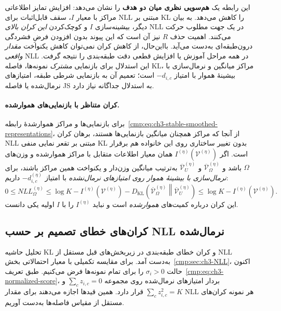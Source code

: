 این رابطه یک \textbf{هم‌سویی نظری میان دو هدف} را نشان می‌دهد:
افزایش تمایز اطلاعاتی مراکز با معیار $I$، سقف قابل‌اثبات
برای NLL مبتنی بر KL را کاهش می‌دهد. به بیان دیگر،
بیشینه‌سازی $I$ و کوچک‌کردن \emph{این کران بالای} NLL
در یک جهت مطلوب حرکت می‌کنند. اهمیت حذف $R$ نیز
آن است که این پیوند بدون افزودن فرضِ فشردگی درون‌طبقه‌ای
به‌دست می‌آید. بااین‌حال، از کاهش کران نمی‌توان
کاهش یکنواخت \emph{مقدار واقعی} NLL در همه مراحل آموزش
یا افزایش قطعی دقت طبقه‌بندی را نتیجه گرفت.
این استدلال برای بازنمایی \emph{مشترک} نمونه‌ها،
فاصله KL، مراکز میانگین و نرمال‌سازی با بیشینهٔ هموار با امتیاز
$-d_{i,c}$ است؛ تعمیم آن به بازنمایی شرطی طبقه،
امتیازهای نرمال‌شده یا فاصله JS به استدلال جداگانه نیاز دارد.

\paragraph{کران متناظر با بازنمایی‌های هموارشده.}
برای بازنمایی‌ها و مراکز هموارشدهٔ
رابطه~\eqref{cmp:eq:ch3-stable-smoothed-representations}،
از آنجا که مراکز همچنان میانگین بازنمایی‌ها هستند، برهان کران NLL
مبتنی بر تقعر نمایی منفی KL
بدون تغییر ساختاری روی این خانواده
هم برقرار است. اگر
$I^{(\eta)}(\mathcal V^{(\eta)})$
همان معیار اطلاعات متقابل با
مراکز هموارشده و وزن‌های $\Omega$ باشد و
$\overline{\mathcal V}^{(\eta)}_{\Omega}$
و $\overline{\mathcal V}^{(\eta)}_U$
به‌ترتیب میانگین وزن‌دار و یکنواخت
همین مراکز باشند، برای
\emph{نرمال‌سازی با بیشینهٔ هموار روی امتیازهای نرمال‌نشده}
با امتیاز $-d_{i,c}^{(\eta)}$ داریم:
\begin{equation}\label{cmp:eq:ch3-stable-NLL-I-bound}
\boxed{
0\le NLL_\Omega^{(\eta)}
\le \log K-I^{(\eta)}(\mathcal V^{(\eta)})
-D_{\mathrm{KL}}\!\left(
\overline{\mathcal V}^{(\eta)}_{\Omega}
\middle\|\overline{\mathcal V}^{(\eta)}_U
\right)
\le\log K-I^{(\eta)}(\mathcal V^{(\eta)}).
}
\end{equation}
این کران درباره کمیت‌های \emph{هموارشده}
است و نباید $I^{(\eta)}$ را با $I$
اولیه یکی دانست.

\subsection{کران‌های خطای تصمیم بر حسب NLL نرمال‌شده}
\label{cmp:subsec:ch3-margin-normalized-bound}
تحلیل حاشیه KL و کران خطای طبقه‌بندی در زیربخش‌های قبل مستقل از NLL به‌دست آمد. برای مقایسه تکمیلی با معیار احتمالاتی بخش~\ref{cmp:sec:ch3-NLL}، اکنون حالت $\sigma_i>0$ را برای تمام نمونه‌ها فرض می‌کنیم. طبق تعریف~\eqref{cmp:eq:ch3-normalized-score}، بردار امتیازهای نرمال‌شده روی مجموعه $\sum_cz_{i,c}=0$ و $\sum_cz_{i,c}^2=K$ قرار دارد. همین قیدها اجازه می‌دهند برای مقدار NLL هر نمونه کران‌های مستقل از مقیاس فاصله‌ها به‌دست آوریم.

